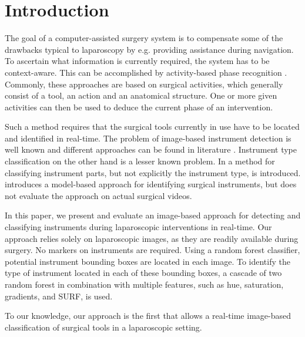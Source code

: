 \documentclass{llncs}
\begin{document}
\section{Introduction}

The goal of a computer-assisted surgery system is to compensate some of the drawbacks typical to laparoscopy by e.g. providing assistance during navigation.
To ascertain what information is currently required, the system has to be context-aware.
This can be accomplished by activity-based phase recognition \cite{lalys2014surgical}\cite{neumuth2011analysis}\cite{KaticIPCAI14}\cite{stauder2014random}.
Commonly, these approaches are based on surgical activities, which generally consist of a tool, an action and an anatomical structure.
One or more given activities can then be used to deduce the current phase of an intervention.

Such a method requires that the surgical tools currently in use have to be located and identified in real-time.
The problem of image-based instrument detection is well known and different approaches can be found in literature \cite{Allan13}\cite{sznitmanMiccai2012a}\cite{voros2007automatic}.
Instrument type classification on the other hand is a lesser known problem.
In \cite{sznitmanMiccai2014} a method for classifying instrument parts, but not explicitly the instrument type, is introduced.
\cite{Speidel2009} introduces a model-based approach for identifying surgical instruments, but does not evaluate the approach on actual surgical videos.

In this paper, we present and evaluate an image-based approach for detecting and classifying instruments during laparoscopic interventions in real-time. 
Our approach relies solely on laparoscopic images, as they are readily available during surgery.
No markers on instruments are required.
Using a random forest classifier, potential instrument bounding boxes are located in each image.
To identify the type of instrument located in each of these bounding boxes, a cascade of two random forest in combination with multiple features, such as hue, saturation, gradients, and SURF, is used.

To our knowledge, our approach is the first that allows a real-time image-based classification of surgical tools in a laparoscopic setting.
\end{document}
